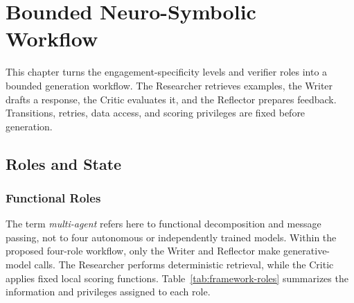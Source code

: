
\chapter{Bounded Neuro-Symbolic Workflow}
\label{chap:framework}

\ifpdf
    \graphicspath{{Chapter5/Figs/Raster/}{Chapter5/Figs/PDF/}{Chapter5/Figs/}{Chapter5/figures/}}
\else
    \graphicspath{{Chapter5/Figs/Vector/}{Chapter5/Figs/}{Chapter5/figures/}}
\fi

This chapter turns the engagement-specificity levels and verifier roles into a bounded generation workflow. The Researcher retrieves examples, the Writer drafts a response, the Critic evaluates it, and the Reflector prepares feedback. Transitions, retries, data access, and scoring privileges are fixed before generation.

\section{Roles and State}

\subsection{Functional Roles}

The term \textit{multi-agent} refers here to functional decomposition and message passing, not to four autonomous or independently trained models. Within the proposed four-role workflow, only the Writer and Reflector make generative-model calls. The Researcher performs deterministic retrieval, while the Critic applies fixed local scoring functions. Table~\ref{tab:framework-roles} summarizes the information and privileges assigned to each role.

